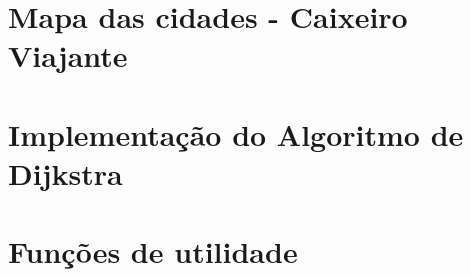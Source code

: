 \documentclass[12pt,plainheader,pnumplain]{abnt}
\newcommand{\src}{src/experiments}
\begin{document}
\newpage
\chapter{Mapa das cidades - Caixeiro Viajante}
\label{appendix:dijks}


\newpage
\chapter{Implementação do Algoritmo de Dijkstra}
\label{appendix:dijks}


\newpage
\chapter{Funções de utilidade}
\label{appendix:fitness}



\end{document}
